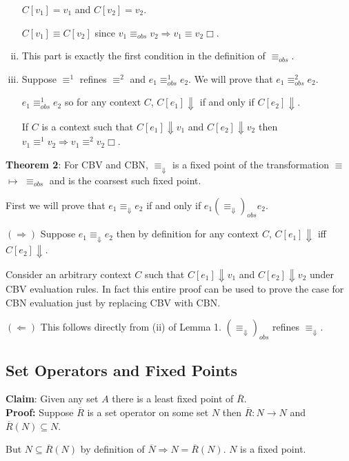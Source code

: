 \documentclass[10pt]{article}
\newcommand{\problem}[1]{\subsection*{\sf #1}}
\begin{document}
\begin{enumerate}[(i)]
$C[v_1] = v_1$ and $C[v_2] = v_2$.

$C[v_1] \equiv C[v_2]$ since   $v_1 \equiv_{obs} v_2 \Rightarrow v_1 \equiv v_2 \Box$.
\item This part is exactly the first condition in the definition of $\equiv_{obs}$.
\item Suppose $\equiv^1$ refines $\equiv^2$ and $e_1 \equiv^1_{obs} e_2$. We will prove that $e_1 \equiv^2_{obs} e_2$.

$e_1 \equiv^1_{obs} e_2$ so for any context $C$, $C[e_1] \Downarrow$ if and only if $C[e_2] \Downarrow$.

If $C$ is a context such that $C[e_1] \Downarrow v_1$ and $C[e_2] \Downarrow v_2$ then $v_1 \equiv^1 v_2 \Rightarrow v_1 \equiv^2 v_2 \Box$. 
\end{enumerate}

\textbf{Theorem 2}: For CBV and CBN, $\equiv_{\Downarrow}$ is a fixed point of the transformation $\equiv$  $\mapsto$  $\equiv_{obs}$  and is the coarsest such fixed point.

First we will prove that $e_1 \equiv_{\Downarrow} e_2$ if and only if $e_1  (\equiv_{\Downarrow})_{obs} e_2$.

$(\Rightarrow)$ Suppose  $e_1 \equiv_{\Downarrow} e_2$ then by definition for any context $C$, $C[e_1] \Downarrow$ iff $C[e_2] \Downarrow$.

Consider an arbitrary context $C$ such that $C[e_1] \Downarrow v_1$ and $C[e_2] \Downarrow v_2$ under CBV evaluation rules. In fact this entire proof can be used to prove the case for CBN evaluation just by replacing CBV with CBN.


$(\Leftarrow)$ This follows directly from (ii) of Lemma 1. $(\equiv_{\Downarrow})_{obs}$ refines $\equiv_{\Downarrow}$.

 
\problem{2 Set Operators and Fixed Points}

\textbf{Claim}: Given any set $A$ there is a least fixed point of $\overline R$.\\

\textbf{Proof:} Suppose $\overline R$ is a set operator on some set $N$ then $\overline R : N \rightarrow N$ and $\overline R (N) \subseteq N$.

But $N \subseteq \overline R (N)$ by definition of $\overline{N} \Rightarrow N = \overline{R} (N)$. $N$ is a fixed point.
\end{document}
